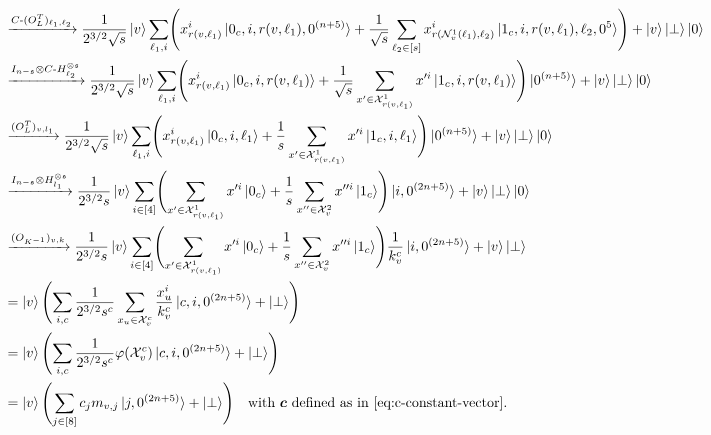\documentclass[
  reprint,
  superscriptaddress,
  amsmath,amssymb,
  aps,prl,
]{revtex4-2}
\begin{document}
\begin{align*}
&\mathrel{\xrightarrow{C\text{-}(O_L^T)_{\ell_1,\ell_2}}} 
\frac{1}{2^{3/2}\sqrt{s}} \ket{v} \sum_{\ell_1,i} \Biggl( x_{\rvl}^i \ket{0_c, i, \rvl, \zero{(n+5)}} 
+ \frac{1}{\sqrt{s}} \sum_{\ell_2\in[s]} x_{\rrvll}^i \ket{1_c, i, \rvl, \ell_2,\zero{5}} \Biggr)
+ \ket{v} \garbage \ket{0} 
\\
&\mathrel{\xrightarrow{I_{n-\mathfrak{s}}\otimes C\text{-}H^{\otimes \mathfrak{s}}_{\ell_2}}} 
\frac{1}{2^{3/2}\sqrt{s}} \ket{v} \sum_{\ell_1,i} \Biggl( x_{\rvl}^i \ket{0_c, i, \rvl} 
+ \frac{1}{\sqrt{s}} \sum_{x' \in \mathcal{X}_{\rvl}^1} x'^i \ket{1_c, i, \rvl} \Biggr) \ketzero{(n + 5)} 
+ \ket{v} \garbage \ket{0} 
\\
&\mathrel{\xrightarrow{(O_L^T)_{v,l_1}}}  
\frac{1}{2^{3/2}\sqrt{s}} \ket{v} \sum_{\ell_1,i} \Biggl( x_{\rvl}^i \ket{0_c, i, \ell_1} 
+ \frac{1}{s} \sum_{x' \in \mathcal{X}_{\rvl}^1} x'^i \ket{1_c, i, \ell_1} \Biggr) \ketzero{(n+5)} 
+ \ket{v} \garbage \ket{0} 
\\
&\mathrel{\xrightarrow{I_{n-\mathfrak{s}}\otimes H^{\otimes \mathfrak{s}}_{l_1}}}  
\frac{1}{2^{3/2}s} \ket{v} \sum_{i\in[4]} \Biggl( \sum_{x' \in \mathcal{X}_{\rvl}^1} x'^i \ket{0_c} 
+ \frac{1}{s} \sum_{x'' \in \mathcal{X}_v^2} x''^i \ket{1_c} \Biggr) \ket{i, \zero{(2n + 5)}} 
+ \ket{v} \garbage \ket{0} 
\\
&\mathrel{\xrightarrow{(O_{K^{-1}})_{v,k}}}  
\frac{1}{2^{3/2}s} \ket{v} \sum_{i\in[4]} \Biggl( \sum_{x' \in \mathcal{X}_{\rvl}^1} x'^i \ket{0_c} 
+ \frac{1}{s} \sum_{x'' \in \mathcal{X}_v^2} x''^i \ket{1_c} \Biggr) \frac{1}{k_v^c} \ket{i, \zero{(2n + 5)}} 
+ \ket{v} \garbage
\\ 
&= \ket{v} \Biggl( \sum_{i,c} \frac{1}{2^{3/2} s^{c}} \sum_{x_u \in \mathcal X_v^c}\frac{x_u^i}{k_v^c}\ket{c,i,0^{ ({2n + 5})}} + \garbage \Biggr) 
\\ 
&= \ket{v} \Biggl( \sum_{i,c} \frac{1}{2^{3/2} s^{c}} \varphi(\mathcal{X}^c_v) \ket{c,i,0^{ ({2n + 5})}} + \garbage \Biggr) 
\\
&= \ket{v} \Biggl( \sum_{j\in [8]} c_j m_{v,j} \ket{j,0^{({2n + 5})}} + \garbage \Biggr) \quad \text{with \(\boldsymbol c\) defined as in~\cref{eq:c-constant-vector}.}
\end{align*}
%
%
%

%
%
%
%
\end{document}

